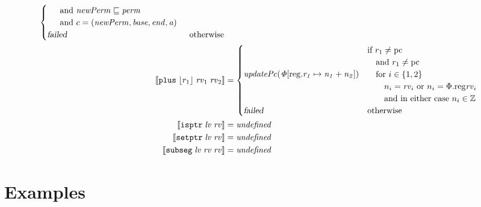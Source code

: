 \documentclass{article}
\newcommand{\update}[2]{[#1 \mapsto #2]}
\newcommand{\sem}[1]{\left\llbracket #1 \right\rrbracket}
\newcommand{\undefined}{\mathit{undefined}}
\newcommand{\var}[1]{\mathit{#1}}
\newcommand{\rv}{\var{rv}}
\newcommand{\lv}{\var{lv}}
\newcommand{\pcreg}{\mathrm{pc}}
\newcommand{\addr}{\var{a}}
\newcommand{\start}{\var{base}}
\newcommand{\addrend}{\var{end}}
\newcommand{\perm}{\var{perm}}
\newcommand{\plainproj}[1]{\mathrm{#1}}
\newcommand{\memreg}[1][\Phi]{#1.\plainproj{reg}}
\newcommand{\updateReg}[3][\Phi]{#1\update{\plainproj{reg}.#2}{#3}}
\newcommand{\failed}{\textsl{failed}}
\newcommand{\plainfun}[1]{\mathit{#1}}
\newcommand{\stdUpdatePc}[1]{\plainfun{updatePc(#1)}}
\newcommand{\ints}{\mathbb{Z}}
\newcommand{\refreg}[1]{\lfloor #1 \rfloor}
\newcommand{\instr}[1]{\mathtt{#1}}
\newcommand{\twoinstr}[3]{\instr{#1} \; #2 \; #3}
\newcommand{\isptr}[2]{\twoinstr{isptr}{#1}{#2}}
\newcommand{\setptr}[2]{\twoinstr{setptr}{#1}{#2}}
\newcommand{\threeinstr}[4]{\instr{#1} \; #2 \; #3 \; #4}
\newcommand{\subseg}[3]{\threeinstr{subseg}{#1}{#2}{#3}}
\newcommand{\plus}[3]{\threeinstr{plus}{#1}{#2}{#3}}
\begin{document}
\begin{align*}
\begin{cases}
\begin{array}{l}
                                                   \quad\text{and $\var{newPerm} \sqsubseteq \perm$}\\
                                                   \quad\text{and $c = (\var{newPerm},\start,\addrend,\addr)$}
                                                 \end{array}\\
                                               \failed                   & \text{otherwise}
                                             \end{cases} \\ 
  \sem{\plus{\refreg{r_1}}{\rv_1}{\rv_2}}               & =
                                                          \begin{cases}
                                                            \stdUpdatePc{\updateReg{r_1}{n_1+n_2}} &
                                                            \arraycolsep=0pt
                                                            \begin{array}{l}
                                                              \text{if $r_1 \neq \pcreg$}\\
                                                              \quad\text{and $r_1\neq \pcreg$}\\
                                                              \quad\text{for $i \in \{1,2\}$}\\
                                                              \qquad\text{$n_i = \rv_i$ or $n_i = \memreg{\rv_i}$}\\
                                                              \qquad\text{and in either case $n_i \in \ints$}
                                                            \end{array}\\
                                                            \failed & \text{otherwise}
                                                          \end{cases}\\
  \sem{\isptr{\lv}{\rv}} & = \undefined \\ 
  \sem{\setptr{\lv}{\rv}} & = \undefined \\ 
  \sem{\subseg{\lv}{\rv}{\rv}} & = \undefined 
\end{align*}

\section{Examples}
\label{sec:examples}
\end{document}
